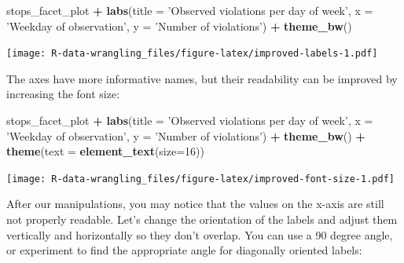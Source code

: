 \documentclass[]{book}
\newenvironment{Shaded}{\begin{snugshade}}{\end{snugshade}}
\newcommand{\KeywordTok}[1]{\textcolor[rgb]{0.13,0.29,0.53}{\textbf{#1}}}
\newcommand{\DataTypeTok}[1]{\textcolor[rgb]{0.13,0.29,0.53}{#1}}
\newcommand{\DecValTok}[1]{\textcolor[rgb]{0.00,0.00,0.81}{#1}}
\newcommand{\StringTok}[1]{\textcolor[rgb]{0.31,0.60,0.02}{#1}}
\newcommand{\OperatorTok}[1]{\textcolor[rgb]{0.81,0.36,0.00}{\textbf{#1}}}
\newcommand{\NormalTok}[1]{#1}
\theoremstyle{definition}
\theoremstyle{definition}
\theoremstyle{definition}
\theoremstyle{remark}
\begin{document}
\begin{Shaded}
\begin{Highlighting}[]
\NormalTok{stops_facet_plot }\OperatorTok{+}
\StringTok{  }\KeywordTok{labs}\NormalTok{(}\DataTypeTok{title =} \StringTok{'Observed violations per day of week'}\NormalTok{,}
         \DataTypeTok{x =} \StringTok{'Weekday of observation'}\NormalTok{,}
         \DataTypeTok{y =} \StringTok{'Number of violations'}\NormalTok{) }\OperatorTok{+}
\StringTok{  }\KeywordTok{theme_bw}\NormalTok{()}
\end{Highlighting}
\end{Shaded}

\texttt{[image: R-data-wrangling\_files/figure-latex/improved-labels-1.pdf]}

The axes have more informative names, but their readability can be
improved by increasing the font size:

\begin{Shaded}
\begin{Highlighting}[]
\NormalTok{stops_facet_plot }\OperatorTok{+}
\StringTok{  }\KeywordTok{labs}\NormalTok{(}\DataTypeTok{title =} \StringTok{'Observed violations per day of week'}\NormalTok{,}
         \DataTypeTok{x =} \StringTok{'Weekday of observation'}\NormalTok{,}
         \DataTypeTok{y =} \StringTok{'Number of violations'}\NormalTok{) }\OperatorTok{+}
\StringTok{  }\KeywordTok{theme_bw}\NormalTok{() }\OperatorTok{+}\StringTok{ }
\StringTok{  }\KeywordTok{theme}\NormalTok{(}\DataTypeTok{text =} \KeywordTok{element_text}\NormalTok{(}\DataTypeTok{size=}\DecValTok{16}\NormalTok{))}
\end{Highlighting}
\end{Shaded}

\texttt{[image: R-data-wrangling\_files/figure-latex/improved-font-size-1.pdf]}

After our manipulations, you may notice that the values on the x-axis
are still not properly readable. Let's change the orientation of the
labels and adjust them vertically and horizontally so they don't
overlap. You can use a 90 degree angle, or experiment to find the
appropriate angle for diagonally oriented labels:
\end{document}

